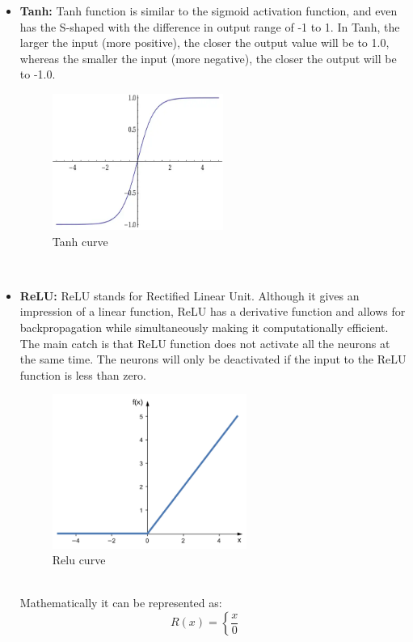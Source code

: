 \begin{enumerate}
        \begin{itemize}
            \item {\bf Tanh:} Tanh function is similar to the sigmoid activation function, and even has the S-shaped with the difference in output range of -1 to 1. In Tanh, the larger the input (more positive), the closer the output value will be to 1.0, whereas the smaller the input (more negative), the closer the output will be to -1.0. 
            \begin{figure}[ht]
                \centering
                \includegraphics[width=2.2in]{./figures/tanhcurve.png}
                \caption{ Tanh curve}
            \end{figure} \\
            \item {\bf ReLU:} ReLU stands for Rectified Linear Unit. Although it gives an impression of a linear function, ReLU has a derivative function and allows for backpropagation while simultaneously making it computationally efficient. The main catch is that ReLU function does not activate all the neurons at the same time. The neurons will only be deactivated if the input to the ReLU function is less than zero.
            \begin{figure}[ht]
                \centering
                \includegraphics[width=2.5in]{./figures/relucurve.png}
                \caption{ Relu curve}
            \end{figure} \\
            Mathematically it can be represented as:
            $$R(x) =\left \{\frac{x}{0} \ \ \ \ \begin{matrix}

\end{matrix}$$
\end{itemize}
\end{enumerate}
